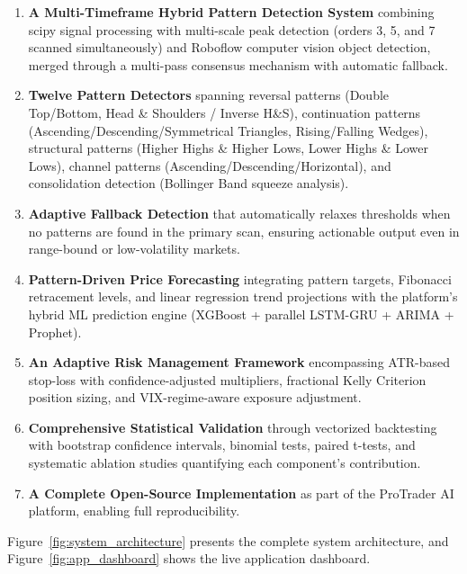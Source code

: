 \documentclass[12pt,a4paper]{article}
\begin{document}
\begin{enumerate}[label=\arabic*.]
    \item \textbf{A Multi-Timeframe Hybrid Pattern Detection System} combining scipy signal processing with multi-scale peak detection (orders 3, 5, and 7 scanned simultaneously) and Roboflow computer vision object detection, merged through a multi-pass consensus mechanism with automatic fallback.
    
    \item \textbf{Twelve Pattern Detectors} spanning reversal patterns (Double Top/Bottom, Head \& Shoulders / Inverse H\&S), continuation patterns (Ascending/Descending/Symmetrical Triangles, Rising/Falling Wedges), structural patterns (Higher Highs \& Higher Lows, Lower Highs \& Lower Lows), channel patterns (Ascending/Descending/Horizontal), and consolidation detection (Bollinger Band squeeze analysis).
    
    \item \textbf{Adaptive Fallback Detection} that automatically relaxes thresholds when no patterns are found in the primary scan, ensuring actionable output even in range-bound or low-volatility markets.
    
    \item \textbf{Pattern-Driven Price Forecasting} integrating pattern targets, Fibonacci retracement levels, and linear regression trend projections with the platform's hybrid ML prediction engine (XGBoost + parallel LSTM-GRU + ARIMA + Prophet).
    
    \item \textbf{An Adaptive Risk Management Framework} encompassing ATR-based stop-loss with confidence-adjusted multipliers, fractional Kelly Criterion position sizing, and VIX-regime-aware exposure adjustment.
    
    \item \textbf{Comprehensive Statistical Validation} through vectorized backtesting with bootstrap confidence intervals, binomial tests, paired t-tests, and systematic ablation studies quantifying each component's contribution.
    
    \item \textbf{A Complete Open-Source Implementation} as part of the ProTrader AI platform, enabling full reproducibility.
\end{enumerate}

Figure~\ref{fig:system_architecture} presents the complete system architecture, and Figure~\ref{fig:app_dashboard} shows the live application dashboard.
\end{document}
